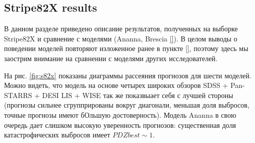 \documentclass[fleqn,usenatbib]{mnras}
\begin{document}

\subsection{Stripe82X results}\label{subsec:s82x_results}

В данном разделе приведено описание результатов, полученных на выборке Stripe82X и сравнение с моделями (Ananna, Brescia \ref{}). В целом выводы о поведении моделей повторяют изложенное ранее в пункте \ref{}, поэтому здесь мы заострим внимание на сравнении с моделями других исследователей.

На рис. \ref{fig:s82x} показаны диаграммы рассеяния прогнозов для шести моделей. Можно видеть, что модель на основе четырех широких обзоров SDSS + Pan-STARRS + DESI LIS + WISE так же показвыает себя с лучшей стороны (прогнозы сильнее сгруппрированы вокруг диагонали, меньшая доля выбросов, точные прогнозы имеют бОльшую достоверность). Модель Ananna в свою очередь дает слишком высокую уверенность прогнозов: существенная доля катастрофических выбросов имеет $PDZbest \sim 1$.
\end{document}
